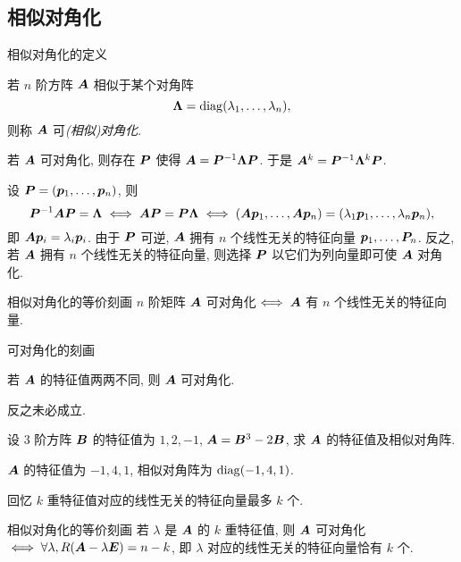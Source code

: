 \subsection{相似对角化}
\begin{frame}{相似对角化的定义}
	\onslide<+->
	\begin{definition}[相似对角化]
		若 $n$ 阶方阵 ${\boldsymbol{A}}$ 相似于某个对角阵
		\[{\boldsymbol{\Lambda}}={\mathrm{diag}}(\lambda_1,\dots,\lambda_n),\]
		则称 ${\boldsymbol{A}}$ 可\emph{(相似)对角化}.
	\end{definition}
	\onslide<+->
	若 ${\boldsymbol{A}}$ 可对角化, 则存在 ${\boldsymbol{P}}$ 使得 ${\boldsymbol{A}}={\boldsymbol{P}}^{-1}{\boldsymbol{\Lambda}}{\boldsymbol{P}}$.
	\onslide<+->
	于是 ${\boldsymbol{A}}^k={\boldsymbol{P}}^{-1}{\boldsymbol{\Lambda}}^k{\boldsymbol{P}}$.
	
	\onslide<+->
	设 ${\boldsymbol{P}}=({\boldsymbol{p}}_1,\dots,{\boldsymbol{p}}_n)$, 则
	\[{\boldsymbol{P}}^{-1}{\boldsymbol{A}}{\boldsymbol{P}}={\boldsymbol{\Lambda}}\iff
	{\boldsymbol{A}}{\boldsymbol{P}}={\boldsymbol{P}}{\boldsymbol{\Lambda}}\iff
	({\boldsymbol{A}}{\boldsymbol{p}}_1,\dots,{\boldsymbol{A}}{\boldsymbol{p}}_n)
	=(\lambda_1{\boldsymbol{p}}_1,\dots,\lambda_n{\boldsymbol{p}}_n),\]
	\onslide<+->
	即 ${\boldsymbol{A}}{\boldsymbol{p}}_i=\lambda_i{\boldsymbol{p}}_i$.
	\onslide<+->
	由于 ${\boldsymbol{P}}$ 可逆, ${\boldsymbol{A}}$ 拥有 $n$ 个线性无关的特征向量 ${\boldsymbol{p}}_1,\dots,{\boldsymbol{P}}_n$.
	\onslide<+->
	反之, 若 ${\boldsymbol{A}}$ 拥有 $n$ 个线性无关的特征向量, 则选择 ${\boldsymbol{P}}$ 以它们为列向量即可使 ${\boldsymbol{A}}$ 对角化.
	\onslide<+->
	\begin{second}{相似对角化的等价刻画}
		$n$ 阶矩阵 ${\boldsymbol{A}}$ 可对角化$\iff{\boldsymbol{A}}$ 有 $n$ 个线性无关的特征向量.
	\end{second}
\end{frame}


\begin{frame}{可对角化的刻画}
	\onslide<+->
	\begin{corollary}
		若 ${\boldsymbol{A}}$ 的特征值两两不同, 则 ${\boldsymbol{A}}$ 可对角化.
	\end{corollary}
	\onslide<+->
	\alert{反之未必成立}.
	\onslide<+->
	\begin{example}
		设 $3$ 阶方阵 ${\boldsymbol{B}}$ 的特征值为 $1,2,-1$, ${\boldsymbol{A}}={\boldsymbol{B}}^3-2{\boldsymbol{B}}$, 求 ${\boldsymbol{A}}$ 的特征值及相似对角阵.
	\end{example}
	\onslide<+->
	\begin{solution}
		${\boldsymbol{A}}$ 的特征值为 $-1,4,1$, 相似对角阵为 ${\mathrm{diag}}(-1,4,1)$.
	\end{solution}
	\onslide<+->
	回忆 $k$ 重特征值对应的线性无关的特征向量最多 $k$ 个.
	\onslide<+->
	\begin{second}{相似对角化的等价刻画}
		若 $\lambda$ 是 ${\boldsymbol{A}}$ 的 $k$ 重特征值, 则 ${\boldsymbol{A}}$ 可对角化 $\iff\forall\lambda, R({\boldsymbol{A}}-\lambda{\boldsymbol{E}})=n-k$, 即 $\lambda$ 对应的线性无关的特征向量恰有 $k$ 个.
	\end{second}
\end{frame}


